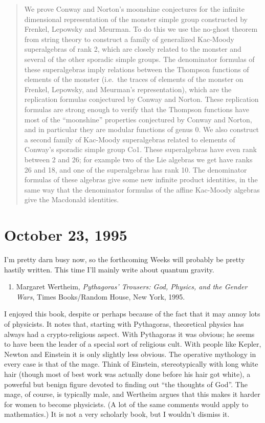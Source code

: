 \documentclass{article}
\def\tightlist{}
\begin{document}
\begin{quote}
We prove Conway and Norton's moonshine conjectures for the infinite
dimensional representation of the monster simple group constructed by
Frenkel, Lepowsky and Meurman. To do this we use the no-ghost theorem
from string theory to construct a family of generalized Kac-Moody
superalgebras of rank 2, which are closely related to the monster and
several of the other sporadic simple groups. The denominator formulas of
these superalgebras imply relations between the Thompson functions of
elements of the monster (i.e.~the traces of elements of the monster on
Frenkel, Lepowsky, and Meurman's representation), which are the
replication formulas conjectured by Conway and Norton. These replication
formulas are strong enough to verify that the Thompson functions have
most of the ``moonshine'' properties conjectured by Conway and Norton,
and in particular they are modular functions of genus 0. We also
construct a second family of Kac-Moody superalgebras related to elements
of Conway's sporadic simple group Co1. These superalgebras have even
rank between 2 and 26; for example two of the Lie algebras we get have
ranks 26 and 18, and one of the superalgebras has rank 10. The
denominator formulas of these algebras give some new infinite product
identities, in the same way that the denominator formulas of the affine
Kac-Moody algebras give the Macdonald identities.
\end{quote}



\hypertarget{week67}{%
\section{October 23, 1995}\label{week67}}

I'm pretty darn busy now, so the forthcoming Weeks will probably be
pretty hastily written. This time I'll mainly write about quantum
gravity.

\begin{enumerate}
\def\labelenumi{\arabic{enumi})}
\tightlist
\item
  Margaret Wertheim, \emph{Pythagoras' Trousers: God, Physics, and the
  Gender Wars}, Times Books/Random House, New York, 1995.
\end{enumerate}

I enjoyed this book, despite or perhaps because of the fact that it may
annoy lots of physicists. It notes that, starting with Pythagoras,
theoretical physics has always had a crypto-religious aspect. With
Pythagoras it was obvious; he seems to have been the leader of a special
sort of religious cult. With people like Kepler, Newton and Einstein it
is only slightly less obvious. The operative mythology in every case is
that of the mage. Think of Einstein, stereotypically with long white
hair (though most of best work was actually done before his hair got
white), a powerful but benign figure devoted to finding out ``the
thoughts of God''. The mage, of course, is typically male, and Wertheim
argues that this makes it harder for women to become physicists. (A lot
of the same comments would apply to mathematics.) It is not a very
scholarly book, but I wouldn't dismiss it.
\end{document}
